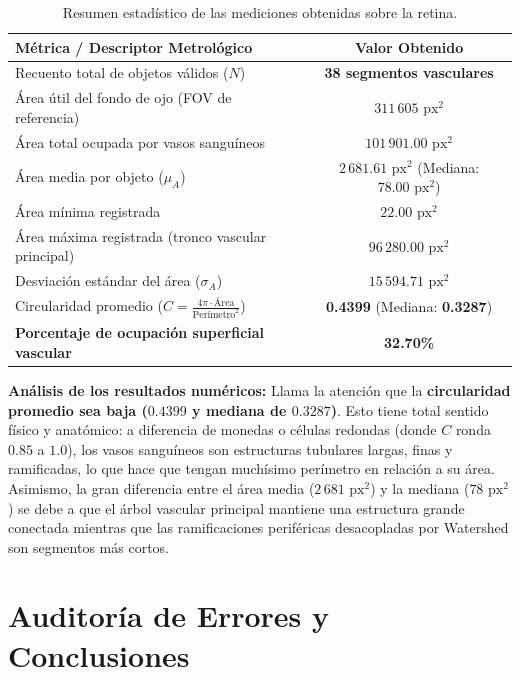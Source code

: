 \documentclass[11pt,a4paper]{article}
\begin{document}
\begin{table}[H]
\centering
\begin{tabular}{@{}lc@{}}
\toprule
\textbf{Métrica / Descriptor Metrológico} & \textbf{Valor Obtenido} \\ \midrule
Recuento total de objetos válidos ($N$) & \textbf{38 segmentos vasculares} \\
Área útil del fondo de ojo (FOV de referencia) & $311\,605\text{ px}^2$ \\
Área total ocupada por vasos sanguíneos & $101\,901.00\text{ px}^2$ \\
Área media por objeto ($\mu_A$) & $2\,681.61\text{ px}^2$ (Mediana: $78.00\text{ px}^2$) \\
Área mínima registrada & $22.00\text{ px}^2$ \\
Área máxima registrada (tronco vascular principal) & $96\,280.00\text{ px}^2$ \\
Desviación estándar del área ($\sigma_A$) & $15\,594.71\text{ px}^2$ \\
Circularidad promedio ($C = \frac{4\pi \cdot \text{Área}}{\text{Perímetro}^2}$) & \textbf{0.4399} (Mediana: \textbf{0.3287}) \\
\textbf{Porcentaje de ocupación superficial vascular} & \textbf{32.70\%} \\ \bottomrule
\end{tabular}
\caption{Resumen estadístico de las mediciones obtenidas sobre la retina.}
\end{table}

\textbf{Análisis de los resultados numéricos:}
Llama la atención que la \textbf{circularidad promedio sea baja ($0.4399$ y mediana de $0.3287$)}. Esto tiene total sentido físico y anatómico: a diferencia de monedas o células redondas (donde $C$ ronda $0.85$ a $1.0$), los vasos sanguíneos son estructuras tubulares largas, finas y ramificadas, lo que hace que tengan muchísimo perímetro en relación a su área. Asimismo, la gran diferencia entre el área media ($2\,681\text{ px}^2$) y la mediana ($78\text{ px}^2$) se debe a que el árbol vascular principal mantiene una estructura grande conectada mientras que las ramificaciones periféricas desacopladas por Watershed son segmentos más cortos.

\section{Auditoría de Errores y Conclusiones}
\end{document}
